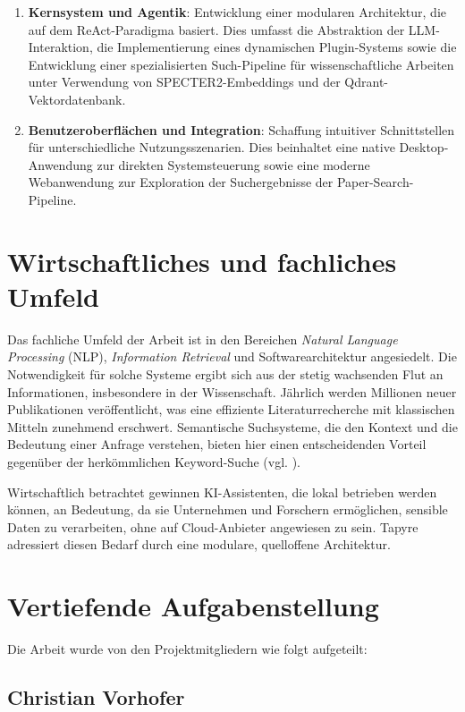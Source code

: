\begin{enumerate}
	\item \textbf{Kernsystem und Agentik}: Entwicklung einer modularen Architektur, die auf dem ReAct-Paradigma basiert. Dies umfasst die Abstraktion der LLM-Interaktion, die Implementierung eines dynamischen Plugin-Systems sowie die Entwicklung einer spezialisierten Such-Pipeline für wissenschaftliche Arbeiten unter Verwendung von SPECTER2-Embeddings und der Qdrant-Vektordatenbank.
	\item \textbf{Benutzeroberflächen und Integration}: Schaffung intuitiver Schnittstellen für unterschiedliche Nutzungsszenarien. Dies beinhaltet eine native Desktop-Anwendung zur direkten Systemsteuerung sowie eine moderne Webanwendung zur Exploration der Suchergebnisse der Paper-Search-Pipeline.
\end{enumerate}

\section{Wirtschaftliches und fachliches Umfeld}

Das fachliche Umfeld der Arbeit ist in den Bereichen \textit{Natural Language Processing} (NLP), \textit{Information Retrieval} und Softwarearchitektur angesiedelt. Die Notwendigkeit für solche Systeme ergibt sich aus der stetig wachsenden Flut an Informationen, insbesondere in der Wissenschaft. Jährlich werden Millionen neuer Publikationen veröffentlicht, was eine effiziente Literaturrecherche mit klassischen Mitteln zunehmend erschwert. Semantische Suchsysteme, die den Kontext und die Bedeutung einer Anfrage verstehen, bieten hier einen entscheidenden Vorteil gegenüber der herkömmlichen Keyword-Suche (vgl. \cite{nandakumar2023specter2}).

Wirtschaftlich betrachtet gewinnen KI-Assistenten, die lokal betrieben werden können, an Bedeutung, da sie Unternehmen und Forschern ermöglichen, sensible Daten zu verarbeiten, ohne auf Cloud-Anbieter angewiesen zu sein. Tapyre adressiert diesen Bedarf durch eine modulare, quelloffene Architektur.

\section{Vertiefende Aufgabenstellung}

Die Arbeit wurde von den Projektmitgliedern wie folgt aufgeteilt:

\subsection{Christian Vorhofer}

